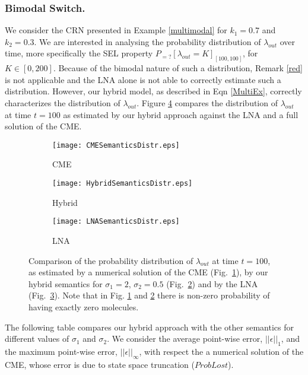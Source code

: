 \documentclass{llncs}
\begin{document}
\subsubsection{Bimodal Switch.}
We consider the CRN presented in Example \ref{multimodal} for $k_1=0.7$ and $k_2=0.3$. We are interested in analysing the probability distribution of $\lambda_{out}$ over time, more specifically the SEL property $P_{=?}[\lambda_{out}=K]_{[100,100]}$, for $K \in [0,200]$. Because of the bimodal nature of such a distribution, Remark \ref{red} is not applicable and the LNA alone is not able to correctly estimate such a distribution. However, our hybrid model, as described in Eqn \eqref{MultiEx}, correctly characterizes the distribution of $\lambda_{out}$.
Figure \ref{DistrFig} compares the distribution of $\lambda_{out}$ at time $t=100$ as estimated by our hybrid approach against the LNA and a full solution of the CME. 
\begin{figure}
	\centering
\begin{subfigure}{.33\textwidth}
     \centering
     \texttt{[image: CMESemanticsDistr.eps]}
     \caption{CME}
     \label{fig:CME}
   \end{subfigure}%
\begin{subfigure}{.33\textwidth}
  \centering
  \texttt{[image: HybridSemanticsDistr.eps]}
  \caption{Hybrid}
  \label{fig:Hybrid}
\end{subfigure}
\begin{subfigure}{0.33\textwidth}
  \centering
  \texttt{[image: LNASemanticsDistr.eps]}
  \caption{LNA}
  \label{fig:LNA}
\end{subfigure}
\caption{Comparison of the probability distribution of $\lambda_{out}$ at time $t=100$, as estimated by a numerical solution of the CME (Fig.\ \ref{fig:CME}), by our hybrid semantics for $\sigma_1=2$, $\sigma_2=0.5$ (Fig.\ \ref{fig:Hybrid}) and by the LNA (Fig.\ \ref{fig:LNA}). { Note that in Fig. \ref{fig:CME} and  \ref{fig:Hybrid} there is non-zero probability of having exactly zero molecules.}}
\label{DistrFig}
\end{figure}%
The following table compares our hybrid approach with the other semantics for different values of $\sigma_1$ and $\sigma_2$. 
We consider the average point-wise error, $||\epsilon||_{1}$, and the maximum point-wise error, $||\epsilon||_{\infty}$, with respect the a numerical solution of the CME, whose error is due to state space truncation ($ProbLost$).
\end{document}
